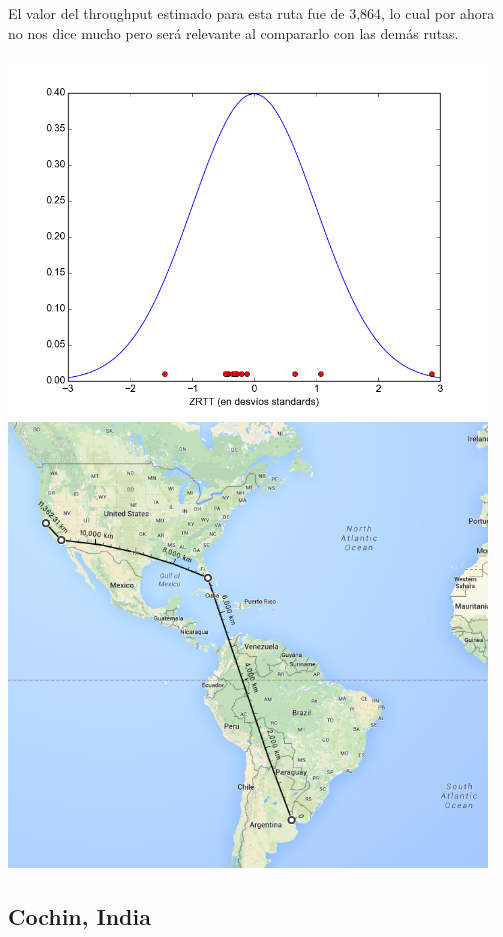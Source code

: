  El valor del throughput estimado para esta ruta fue de 3,864, lo cual por ahora no nos dice mucho pero será relevante al compararlo con las demás rutas.

 \includegraphics[width=5in]{imgs/berkeley_dist.png}
 \includegraphics[width=5in]{imgs/maps/berkeley.png}


\subsection{Cochin, India}

